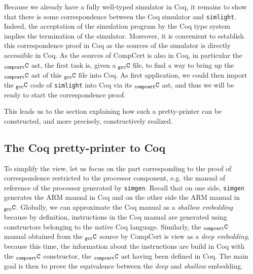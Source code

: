 \documentclass[a4paper, 11pt]{article}
\newcommand{\simlight}{{\tt simlight}\xspace}
\newcommand{\simgen}{{\tt simgen}\xspace}
\newcommand{\C}{$_{\tt compcert}{\tt C}$\xspace}
\newcommand{\gccC}{$_{\tt gcc}{\tt C}$\xspace}
\begin{document}
Because we already have a fully well-typed simulator in Coq, it remains to show that there is some correspondence between the Coq simulator and \simlight. Indeed, the acceptation of the simulation program by the Coq type system implies the termination of the simulator. Moreover, it is convenient to establish this correspondence proof in Coq as the sources of the simulator is directly accessible in Coq. As the sources of CompCert is also in Coq, in particular the \C ast, the first task is, given a \gccC file, to find a way to bring up the \C ast of this \gccC file into Coq. As first application, we could then import the \gccC code of \simlight into Coq via its \C ast, and thus we will be ready to start the correspondence proof.

This leads us to the section explaining how such a pretty-printer can be constructed, and more precisely, constructively realized.
\subsection{The Coq pretty-printer to Coq}
To simplify the view, let us focus on the part corresponding to the proof of correspondence restricted to the processor component, e.g. the manual of reference of the processor generated by \simgen. Recall that on one side, \simgen generates the ARM manual in Coq and on the other side the ARM manual in \gccC. Globally, we can approximate the Coq manual as a \emph{shallow embedding} because by definition, instructions in the Coq manual are generated using constructors belonging to the native Coq language. Similarly, the \C manual obtained from the \gccC source by CompCert is view as a \emph{deep embedding}, because this time, the information about the instructions are build in Coq with the \C constructor, the \C ast having been defined in Coq. The main goal is then to prove the equivalence between the \emph{deep} and \emph{shallow} embedding.
\end{document}
